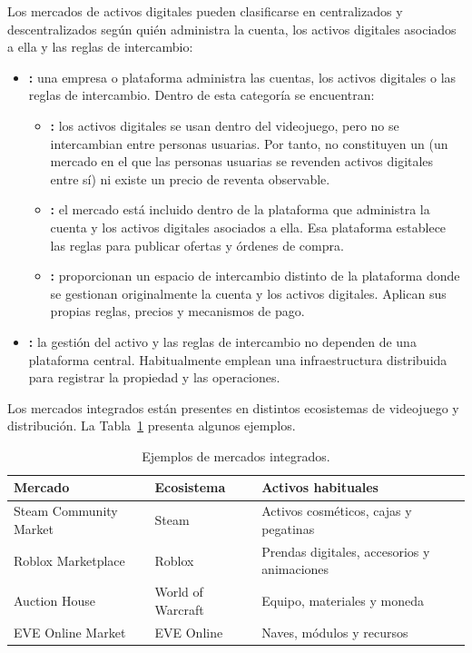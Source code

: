 Los mercados de activos digitales pueden clasificarse en centralizados y descentralizados según quién administra la cuenta, los activos digitales asociados a ella y las reglas de intercambio:
\begin{itemize}
    \item \textbf{:} una empresa o plataforma administra las cuentas, los activos digitales o las reglas de intercambio. Dentro de esta categoría se encuentran:
    \begin{itemize}
        \item \textbf{:} los activos digitales se usan dentro del videojuego, pero no se intercambian entre personas usuarias. Por tanto, no constituyen un \textbf{} (un mercado en el que las personas usuarias se revenden activos digitales entre sí) ni existe un precio de reventa observable.
        \item \textbf{:} el mercado está incluido dentro de la plataforma que administra la cuenta y los activos digitales asociados a ella. Esa plataforma establece las reglas para publicar ofertas y órdenes de compra.
        \item \textbf{:} proporcionan un espacio de intercambio distinto de la plataforma donde se gestionan originalmente la cuenta y los activos digitales. Aplican sus propias reglas, precios y mecanismos de pago.
    \end{itemize}
    \item \textbf{:} la gestión del activo y las reglas de intercambio no dependen de una plataforma central. Habitualmente emplean una infraestructura distribuida para registrar la propiedad y las operaciones.
\end{itemize}

Los mercados integrados están presentes en distintos ecosistemas de videojuego y distribución. La Tabla~\ref{tab:mercados-integrados} presenta algunos ejemplos.

\begin{table}[H]
\centering
\small
\begin{tabularx}{\textwidth}{@{}p{}p{}X@{}}
\toprule
\textbf{Mercado} & \textbf{Ecosistema} & \textbf{Activos habituales} \\
\midrule
Steam Community Market & Steam & Activos cosméticos, cajas y pegatinas \\
Roblox Marketplace & Roblox & Prendas digitales, accesorios y animaciones \\
Auction House & World of Warcraft & Equipo, materiales y moneda \\
EVE Online Market & EVE Online & Naves, módulos y recursos \\
\bottomrule
\end{tabularx}
\caption{Ejemplos de mercados integrados.}
\label{tab:mercados-integrados}
\end{table}

